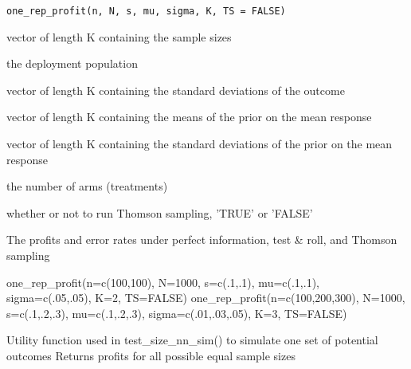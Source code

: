 \documentclass[a4paper]{book}
\begin{document}
%
\begin{Usage}
\begin{verbatim}
one_rep_profit(n, N, s, mu, sigma, K, TS = FALSE)
\end{verbatim}
\end{Usage}
%
\begin{Arguments}
\begin{ldescription}
\item[\code{n}] vector of length K containing the sample sizes

\item[\code{N}] the deployment population

\item[\code{s}] vector of length K containing the standard deviations of the outcome

\item[\code{mu}] vector of length K containing the means of the prior on the mean response

\item[\code{sigma}] vector of length K containing the standard deviations of the prior on the mean response

\item[\code{K}] the number of arms (treatments)

\item[\code{TS}] whether or not to run Thomson sampling, 'TRUE' or 'FALSE'
\end{ldescription}
\end{Arguments}
%
\begin{Value}
The profits and error rates under perfect information, test \& roll, and Thomson sampling
\end{Value}
%
\begin{Examples}
\begin{ExampleCode}
one_rep_profit(n=c(100,100), N=1000, s=c(.1,.1), mu=c(.1,.1), sigma=c(.05,.05), K=2, TS=FALSE)
one_rep_profit(n=c(100,200,300), N=1000, s=c(.1,.2,.3), mu=c(.1,.2,.3), sigma=c(.01,.03,.05), K=3, TS=FALSE)
\end{ExampleCode}
\end{Examples}
%
\begin{Description}\relax
Utility function used in test\_size\_nn\_sim() to simulate one set of potential outcomes
Returns profits for all possible equal sample sizes
\end{Description}
\end{document}
